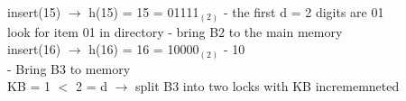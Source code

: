 \documentclass[12pt]{article}
\begin{document}
	insert(15) $\rightarrow$ h(15) = 15 = 01111$_{(2)}$ - the first d = 2 digits are 01\\
	look for item 01 in directory - bring B2 to the main memory\\
	
	insert(16) $\rightarrow$ h(16) = 16 = 10000$_{(2)}$ - 10\\
	- Bring B3 to memory\\
	KB = 1 $<$ 2 = d $\rightarrow$ split B3 into two locks with KB incrememneted\\
	
	
	
	
\end{document}
